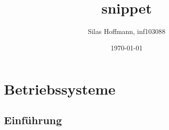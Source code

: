 \documentclass{article}
\title{snippet}
\author{Silas Hoffmann, inf103088}
\date{\today}
\begin{document}
\maketitle
\vspace{0.5cm}
\tableofcontents
\clearpage

\section{Betriebssysteme}
\subsection{Einführung}
\end{document}
